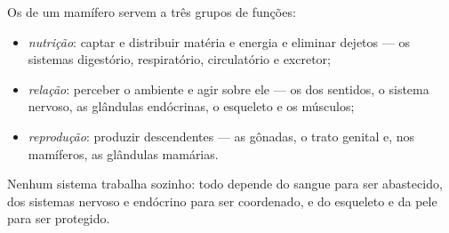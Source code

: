 \begin{proposition}\label{prop:b1:mammal-organization:functions}
Os  de um mamífero servem a três grupos de funções:
\begin{itemize}
  \item \emph{nutrição}: captar e distribuir
        matéria e energia e eliminar dejetos --- os sistemas digestório,
        respiratório, circulatório e excretor;
  \item \emph{relação}: perceber o ambiente e
        agir sobre ele --- os  dos sentidos, o sistema nervoso, as
        glândulas endócrinas, o esqueleto e os músculos;
  \item \emph{reprodução}: produzir
        descendentes --- as gônadas, o trato genital e, nos mamíferos,
        as glândulas mamárias.
\end{itemize}
Nenhum sistema trabalha sozinho: todo  depende do sangue para ser
abastecido, dos sistemas nervoso e endócrino para ser coordenado, e do
esqueleto e da pele para ser protegido.
\end{proposition}

